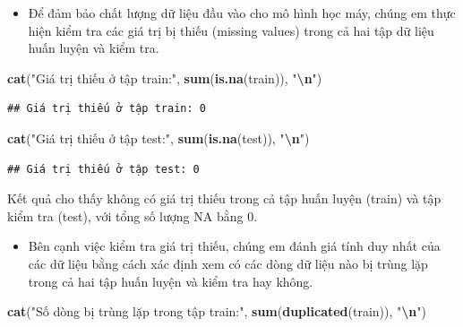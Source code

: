 \documentclass[
]{article}
\newenvironment{Shaded}{\begin{snugshade}}{\end{snugshade}}
\newcommand{\FunctionTok}[1]{\textcolor[rgb]{0.13,0.29,0.53}{\textbf{#1}}}
\newcommand{\NormalTok}[1]{#1}
\newcommand{\SpecialCharTok}[1]{\textcolor[rgb]{0.81,0.36,0.00}{\textbf{#1}}}
\newcommand{\StringTok}[1]{\textcolor[rgb]{0.31,0.60,0.02}{#1}}
\providecommand{\tightlist}{%
  \setlength{\itemsep}{0pt}\setlength{\parskip}{0pt}}
\begin{document}
\begin{itemize}
\tightlist
\item
  Để đảm bảo chất lượng dữ liệu đầu vào cho mô hình học máy, chúng em
  thực hiện kiểm tra các giá trị bị thiếu (missing values) trong cả hai
  tập dữ liệu huấn luyện và kiểm tra.
\end{itemize}

\begin{Shaded}
\begin{Highlighting}[]
\FunctionTok{cat}\NormalTok{(}\StringTok{"Giá trị thiếu ở tập train:"}\NormalTok{, }\FunctionTok{sum}\NormalTok{(}\FunctionTok{is.na}\NormalTok{(train)), }\StringTok{"}\SpecialCharTok{\textbackslash{}n}\StringTok{"}\NormalTok{)}
\end{Highlighting}
\end{Shaded}

\begin{verbatim}
## Giá trị thiếu ở tập train: 0
\end{verbatim}

\begin{Shaded}
\begin{Highlighting}[]
\FunctionTok{cat}\NormalTok{(}\StringTok{"Giá trị thiếu ở tập test:"}\NormalTok{, }\FunctionTok{sum}\NormalTok{(}\FunctionTok{is.na}\NormalTok{(test)), }\StringTok{"}\SpecialCharTok{\textbackslash{}n}\StringTok{"}\NormalTok{)}
\end{Highlighting}
\end{Shaded}

\begin{verbatim}
## Giá trị thiếu ở tập test: 0
\end{verbatim}

Kết quả cho thấy không có giá trị thiếu trong cả tập huấn luyện (train)
và tập kiểm tra (test), với tổng số lượng NA bằng 0.

\begin{itemize}
\tightlist
\item
  Bên cạnh việc kiểm tra giá trị thiếu, chúng em đánh giá tính duy nhất
  của các dữ liệu bằng cách xác định xem có các dòng dữ liệu nào bị
  trùng lặp trong cả hai tập huấn luyện và kiểm tra hay không.
\end{itemize}

\begin{Shaded}
\begin{Highlighting}[]
\FunctionTok{cat}\NormalTok{(}\StringTok{"Số dòng bị trùng lặp trong tập train:"}\NormalTok{, }\FunctionTok{sum}\NormalTok{(}\FunctionTok{duplicated}\NormalTok{(train)), }\StringTok{"}\SpecialCharTok{\textbackslash{}n}\StringTok{"}\NormalTok{)}
\end{Highlighting}
\end{Shaded}
\end{document}
